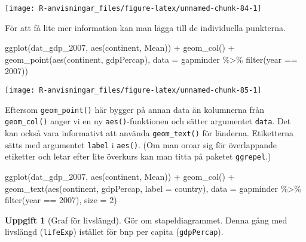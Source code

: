\documentclass[
]{book}
\newenvironment{Shaded}{\begin{snugshade}}{\end{snugshade}}
\newcommand{\AttributeTok}[1]{\textcolor[rgb]{0.77,0.63,0.00}{#1}}
\newcommand{\DecValTok}[1]{\textcolor[rgb]{0.00,0.00,0.81}{#1}}
\newcommand{\FunctionTok}[1]{\textcolor[rgb]{0.00,0.00,0.00}{#1}}
\newcommand{\NormalTok}[1]{#1}
\newcommand{\SpecialCharTok}[1]{\textcolor[rgb]{0.00,0.00,0.00}{#1}}
\theoremstyle{definition}
\theoremstyle{definition}
\theoremstyle{definition}
\newtheorem{exercise}{Uppgift}[chapter]
\theoremstyle{definition}
\theoremstyle{remark}
\begin{document}
\begin{center}\texttt{[image: R-anvisningar\_files/figure-latex/unnamed-chunk-84-1]} \end{center}

För att få lite mer information kan man lägga till de individuella punkterna.

\begin{Shaded}
\begin{Highlighting}[]
\FunctionTok{ggplot}\NormalTok{(dat\_gdp\_2007, }\FunctionTok{aes}\NormalTok{(continent, Mean)) }\SpecialCharTok{+}
  \FunctionTok{geom\_col}\NormalTok{() }\SpecialCharTok{+}
  \FunctionTok{geom\_point}\NormalTok{(}\FunctionTok{aes}\NormalTok{(continent, gdpPercap), }\AttributeTok{data =}\NormalTok{ gapminder }\SpecialCharTok{\%\textgreater{}\%} \FunctionTok{filter}\NormalTok{(year }\SpecialCharTok{==} \DecValTok{2007}\NormalTok{))}
\end{Highlighting}
\end{Shaded}

\begin{center}\texttt{[image: R-anvisningar\_files/figure-latex/unnamed-chunk-85-1]} \end{center}

Eftersom \texttt{geom\_point()} här bygger på annan data än kolumnerna från \texttt{geom\_col()} anger vi en ny \texttt{aes()}-funktionen och sätter argumentet \texttt{data}. Det kan också vara informativt att använda \texttt{geom\_text()} för länderna. Etiketterna sätts med argumentet \texttt{label} i \texttt{aes()}. (Om man oroar sig för överlappande etiketter och letar efter lite överkurs kan man titta på paketet \texttt{ggrepel}.)

\begin{Shaded}
\begin{Highlighting}[]
\FunctionTok{ggplot}\NormalTok{(dat\_gdp\_2007, }\FunctionTok{aes}\NormalTok{(continent, Mean)) }\SpecialCharTok{+}
  \FunctionTok{geom\_col}\NormalTok{() }\SpecialCharTok{+}
  \FunctionTok{geom\_text}\NormalTok{(}\FunctionTok{aes}\NormalTok{(continent, gdpPercap, }\AttributeTok{label =}\NormalTok{ country), }\AttributeTok{data =}\NormalTok{ gapminder }\SpecialCharTok{\%\textgreater{}\%} \FunctionTok{filter}\NormalTok{(year }\SpecialCharTok{==} \DecValTok{2007}\NormalTok{), }\AttributeTok{size =} \DecValTok{2}\NormalTok{)}
\end{Highlighting}
\end{Shaded}

\begin{exercise}[Graf för livslängd]
Gör om stapeldiagrammet. Denna gång med livslängd (\texttt{lifeExp}) istället för bnp per capita (\texttt{gdpPercap}).
\end{exercise}
\end{document}
